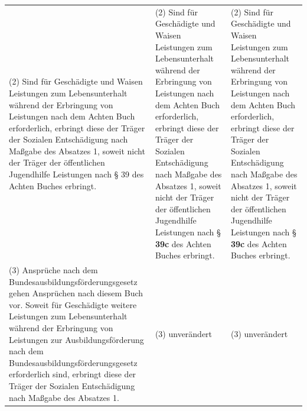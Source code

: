 \documentclass[10pt,a4paper,landscape]{article}
\begin{document}
\begin{longtable}{|L{8.2cm}|L{8.2cm}|L{8.2cm}|}
(2) Sind für Geschädigte und Waisen  \newline Leistungen zum Lebensunterhalt während  \newline der Erbringung von Leistungen nach dem  \newline Achten Buch erforderlich, erbringt diese der  \newline Träger der Sozialen Entschädigung nach  \newline Maßgabe des Absatzes 1, soweit nicht der  \newline Träger der öffentlichen Jugendhilfe  \newline Leistungen nach \S{} \textcolor{diffred}{39} des Achten Buches  \newline erbringt. & (2) Sind für Geschädigte und Waisen  \newline Leistungen zum Lebensunterhalt während  \newline der Erbringung von Leistungen nach dem  \newline Achten Buch erforderlich, erbringt diese der  \newline Träger der Sozialen Entschädigung nach  \newline Maßgabe des Absatzes 1, soweit nicht der  \newline Träger der öffentlichen Jugendhilfe  \newline Leistungen nach \S{} \textbf{39c} des Achten Buches  \newline erbringt. & (2) Sind für Geschädigte und Waisen  \newline Leistungen zum Lebensunterhalt während  \newline der Erbringung von Leistungen nach dem  \newline Achten Buch erforderlich, erbringt diese der  \newline Träger der Sozialen Entschädigung nach  \newline Maßgabe des Absatzes 1, soweit nicht der  \newline Träger der öffentlichen Jugendhilfe  \newline Leistungen nach \S{} \textbf{39c} des Achten Buches  \newline erbringt. \\
\hhline{|---|}
(3) Ansprüche nach dem  \newline Bundesausbildungsförderungsgesetz  \newline gehen Ansprüchen nach diesem Buch vor.  \newline Soweit für Geschädigte weitere Leistungen  \newline zum Lebensunterhalt während der  \newline Erbringung von Leistungen zur  \newline Ausbildungsförderung nach dem  \newline Bundesausbildungsförderungsgesetz  \newline erforderlich sind, erbringt diese der Träger  \newline der Sozialen Entschädigung nach  \newline Maßgabe des Absatzes 1. & (3) unverändert & (3) unverändert \\

\end{longtable}
\end{document}
